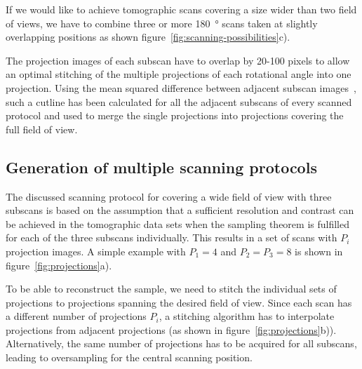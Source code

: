 If we would like to achieve tomographic scans covering a size wider than two field of views, we have to combine three or more \SI{180}{\degree} scans taken at slightly overlapping positions as shown figure~\ref{fig:scanning-possibilities}c).

The projection images of each subscan have to overlap by 20-100 pixels to allow an optimal stitching of the multiple projections of each rotational angle into one projection. Using the mean squared difference between adjacent subscan images~\cite{Hintermueller2009}, such a cutline has been calculated for all the adjacent subscans of every scanned protocol and used to merge the single projections into projections covering the full field of view.

\subsection{Generation of multiple scanning protocols}%
The discussed scanning protocol for covering a wide field of view with three subscans is based on the assumption that a sufficient resolution and contrast can be achieved in the tomographic data sets when the sampling theorem is fulfilled for each of the three subscans individually. This results in a set of scans with $P_{i}$ projection images. A simple example with $P_{1}=4$ and $P_{2}=P_{3}=8$ is shown in figure~\ref{fig:projections}a).

To be able to reconstruct the sample, we need to stitch the individual sets of projections to projections spanning the desired field of view. Since each scan has a different number of projections $P_{i}$, a stitching algorithm has to interpolate projections from adjacent projections (as shown in figure~\ref{fig:projections}b)). Alternatively, the same number of projections has to be acquired for all subscans, leading to oversampling for the central scanning position.

